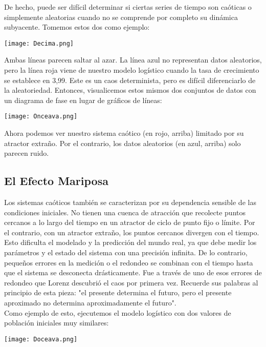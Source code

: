 \documentclass[12pt]{article}
\begin{document}
De hecho, puede ser difícil determinar si ciertas series de tiempo son caóticas o simplemente aleatorias cuando no se comprende por completo su dinámica subyacente. Tomemos estos dos como ejemplo:
\begin{center}
    \texttt{[image: Decima.png]}
\end{center}
Ambas líneas parecen saltar al azar. La línea azul no representan datos aleatorios, pero la línea roja viene de nuestro modelo logístico cuando la tasa de crecimiento se establece en 3,99. Este es un caos determinista, pero es difícil diferenciarlo de la aleatoriedad. Entonces, visualicemos estos mismos dos conjuntos de datos con un diagrama de fase en lugar de gráficos de líneas:
\begin{center}
    \texttt{[image: Onceava.png]}
\end{center}
Ahora podemos ver nuestro sistema caótico (en rojo, arriba) limitado por su atractor extraño. Por el contrario, los datos aleatorios (en azul, arriba) solo parecen ruido.
\subsection*{El Efecto Mariposa}
Los sistemas caóticos también se caracterizan por su dependencia sensible de las condiciones iniciales. No tienen una cuenca de atracción que recolecte puntos cercanos a lo largo del tiempo en un atractor de ciclo de punto fijo o límite. Por el contrario, con un atractor extraño, los puntos cercanos divergen con el tiempo.\\

Esto dificulta el modelado y la predicción del mundo real, ya que debe medir los parámetros y el estado del sistema con una precisión infinita. De lo contrario, pequeños errores en la medición o el redondeo se combinan con el tiempo hasta que el sistema se desconecta drásticamente. Fue a través de uno de esos  errores de redondeo que Lorenz descubrió el caos por primera vez. Recuerde sus palabras al principio de esta pieza: "el presente determina el futuro, pero el presente aproximado no determina aproximadamente el futuro".\\

Como ejemplo de esto, ejecutemos el modelo logístico con dos valores de población iniciales muy similares:

\begin{center}
    \texttt{[image: Doceava.png]}
\end{center}
\end{document}

